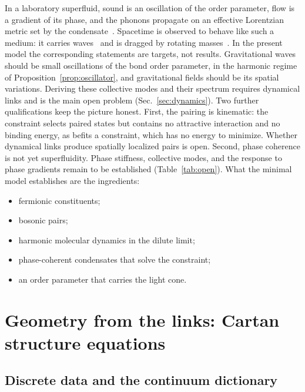 \documentclass[reprint,aps,prd,amsmath,amssymb,superscriptaddress,nofootinbib,floatfix]{revtex4-2}
\theoremstyle{plain}
\theoremstyle{definition}
\theoremstyle{remark}
\begin{document}
In a laboratory superfluid, sound is an oscillation of the order parameter, flow is a gradient of its phase, and the
phonons propagate on an effective Lorentzian metric set by the condensate~\cite{Unruh1981,Barcelo2011,Volovik2009}. Spacetime
is observed to behave like such a medium: it carries waves~\cite{GW150914} and is dragged by rotating
masses~\cite{Everitt2011}. In the present model the corresponding statements are targets, not results. Gravitational waves
should be small oscillations of the bond order parameter, in the harmonic regime of Proposition~\ref{prop:oscillator}, and
gravitational fields should be its spatial variations. Deriving these collective modes and their spectrum requires
dynamical links and is the main open problem (Sec.~\ref{sec:dynamics}). Two further qualifications keep the picture honest. First, the pairing is kinematic: the constraint selects paired
states but contains no attractive interaction and no binding energy, as befits a constraint, which has no energy to
minimize. Whether dynamical links produce spatially localized pairs is open. Second, phase coherence is not yet
superfluidity. Phase stiffness, collective modes, and the response to phase gradients remain to be established
(Table~\ref{tab:open}). What the minimal model establishes are the ingredients:
\begin{itemize}
\item fermionic constituents;
\item bosonic pairs;
\item harmonic molecular dynamics in the dilute limit;
\item phase-coherent condensates that solve the constraint;
\item an order parameter that carries the light cone.
\end{itemize}

\section{Geometry from the links: Cartan structure equations}
\label{sec:geometry}

\subsection{Discrete data and the continuum dictionary}
\end{document}
